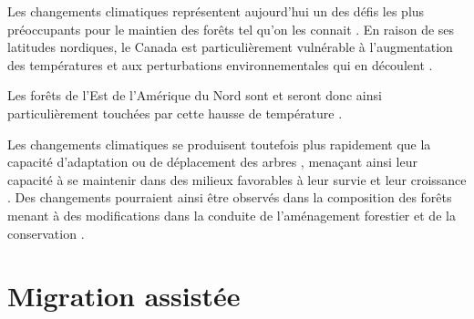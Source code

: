 


Les changements climatiques représentent aujourd'hui un des défis les plus préoccupants pour le maintien des forêts tel qu'on les connait \citep{McKenney2009Climatechange,Trumbore2015Foresthealth,Seidl2017Forestdisturbances,Messier2022Warningnatural}.  
En raison de ses latitudes nordiques, le Canada est particulièrement vulnérable à l'augmentation des températures et aux perturbations environnementales qui en découlent \citep{Alo2008Potentialfuture,Bush2019Canadachanging}. 

Les forêts de l'Est de l'Amérique du Nord sont et seront donc ainsi particulièrement touchées par cette hausse de température \citep{Park2014Canboreal,Mahony2017closerlook,Sittaro2017Treerange,Messier2022Warningnatural}.


Les changements climatiques se produisent toutefois plus rapidement que la capacité d'adaptation ou de déplacement des arbres \citep{Aitken2008Adaptationmigration,Loarie2009velocityclimate,Vitt2010Assistedmigration,Harrison2020Plantcommunity}, 
menaçant ainsi leur capacité à se maintenir dans des milieux favorables à leur survie et leur croissance \citep{Zhu2012Failuremigrate,Sittaro2017Treerange,Woodall2018Decadalchanges}.
Des changements pourraient ainsi être observés dans la composition des forêts menant à des modifications dans la conduite de l'aménagement forestier et de la conservation \citep{McKenney2009Climatechange,Chmura2011Forestresponses,Lo2011Linkingclimate}.









\section*{Migration assistée}
\label{sec:fam}

